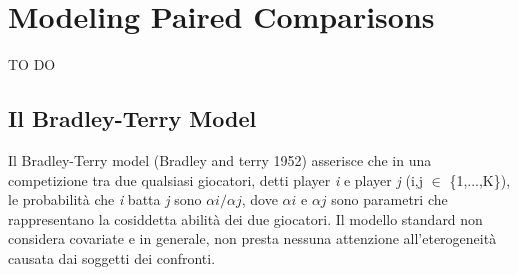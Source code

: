 \chapter{Modeling Paired Comparisons}

TO DO

\section{Il Bradley-Terry Model}
Il Bradley-Terry model (Bradley and terry 1952) asserisce che in una competizione tra due qualsiasi giocatori, detti player \textit{i} e player \textit{j} (i,j $\in$ \{1,...,K\}), le probabilità che \textit{i} batta \textit{j} sono $\alpha{i}/\alpha{j}$, dove $\alpha{i}$ e $\alpha{j}$ sono parametri che rappresentano la cosiddetta abilità dei due giocatori. Il modello standard non considera covariate e in generale, non presta nessuna attenzione all'eterogeneità causata dai soggetti dei confronti.
\subsubsection{}	

	